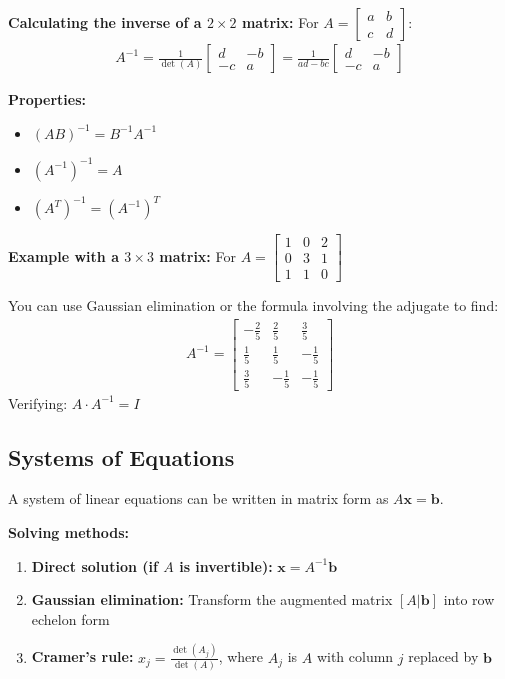 \documentclass{article}
\begin{document}
\textbf{Calculating the inverse of a $2 \times 2$ matrix:}
For $A = \begin{bmatrix} a & b \\ c & d \end{bmatrix}$:
\begin{align}
A^{-1} = \frac{1}{\det(A)} \begin{bmatrix} d & -b \\ -c & a \end{bmatrix} = \frac{1}{ad-bc} \begin{bmatrix} d & -b \\ -c & a \end{bmatrix}
\end{align}

\textbf{Properties:}
\begin{itemize}
    \item $(AB)^{-1} = B^{-1}A^{-1}$
    \item $(A^{-1})^{-1} = A$
    \item $(A^T)^{-1} = (A^{-1})^T$
\end{itemize}

\textbf{Example with a $3 \times 3$ matrix:}
For $A = \begin{bmatrix} 1 & 0 & 2 \\ 0 & 3 & 1 \\ 1 & 1 & 0 \end{bmatrix}$

You can use Gaussian elimination or the formula involving the adjugate to find:
\begin{align}
A^{-1} = \begin{bmatrix} 
-\frac{2}{5} & \frac{2}{5} & \frac{3}{5} \\
\frac{1}{5} & \frac{1}{5} & -\frac{1}{5} \\
\frac{3}{5} & -\frac{1}{5} & -\frac{1}{5}
\end{bmatrix}
\end{align}
Verifying: $A \cdot A^{-1} = I$

\subsection{Systems of Equations}

A system of linear equations can be written in matrix form as $A\mathbf{x} = \mathbf{b}$.

\textbf{Solving methods:}
\begin{enumerate}
    \item \textbf{Direct solution (if $A$ is invertible):} $\mathbf{x} = A^{-1}\mathbf{b}$
    \item \textbf{Gaussian elimination:} Transform the augmented matrix $[A|\mathbf{b}]$ into row echelon form
    \item \textbf{Cramer's rule:} $x_j = \frac{\det(A_j)}{\det(A)}$, where $A_j$ is $A$ with column $j$ replaced by $\mathbf{b}$
\end{enumerate}
\end{document}
